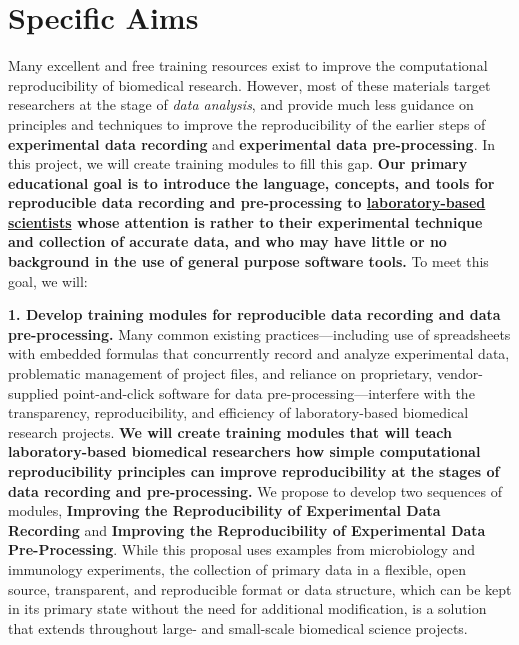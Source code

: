 \documentclass[pdftex,english,11.5pt,parskip=half]{scrartcl}
\begin{document}
\def\bf{\normalfont\bfseries}
\pagestyle{empty}

\section*{Specific Aims}
\begingroup
    \fontsize{11pt}{12pt}\selectfont 
    
Many excellent and free training resources exist to improve the computational reproducibility of biomedical research. However, most of these materials target researchers at the stage of \textit{data analysis}, and provide much less guidance on principles and techniques to improve the 
reproducibility of the earlier steps of \textbf{experimental data recording} and \textbf{experimental data pre-processing}. In this project, we will create training modules to fill this gap. \textbf{Our primary educational goal is to introduce the language, concepts, and tools for reproducible data recording and pre-processing to \underline{laboratory-based scientists} whose attention is rather to 
their experimental technique and collection of accurate data, and who may have little or no background 
in the use of general purpose software tools.} To meet this goal, we will:

\textbf{1. Develop training modules for reproducible data recording and data pre-processing.} 
Many common existing practices---including use of spreadsheets with embedded formulas that 
concurrently record and analyze experimental data, problematic management of project files,
and reliance on proprietary, vendor-supplied point-and-click software for data
pre-processing---interfere with the transparency, reproducibility, and
efficiency of laboratory-based biomedical research projects. \textbf{We will create training modules that will teach laboratory-based biomedical
researchers how simple computational reproducibility principles can improve
reproducibility at the stages of data recording and
pre-processing.} We propose to develop two sequences of modules, \textbf{Improving the
Reproducibility of Experimental Data Recording} and \textbf{Improving the
Reproducibility of Experimental Data Pre-Processing}. 
While this proposal uses examples from microbiology 
and immunology experiments, the collection of primary data in a flexible, open source, 
transparent, and reproducible format or data structure, which can be kept in its primary state 
without the need for additional modification, is a solution that extends throughout large- and 
small-scale biomedical science projects.
\end{document}
